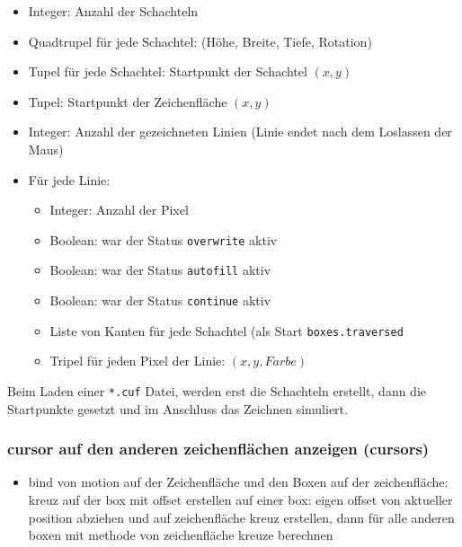 \begin{itemize}
\item Integer: Anzahl der Schachteln
\item Quadtrupel für jede Schachtel: (Höhe, Breite, Tiefe, Rotation)
\item Tupel für jede Schachtel: Startpunkt der Schachtel $(x,y)$
\item Tupel: Startpunkt der Zeichenfläche $(x,y)$
\item Integer: Anzahl der gezeichneten Linien (Linie endet nach dem Loslassen der Maus)
\item Für jede Linie:
  \begin{itemize}
    \item Integer: Anzahl der Pixel
    \item Boolean: war der Status \texttt{overwrite} aktiv
    \item Boolean: war der Status \texttt{autofill} aktiv
    \item Boolean: war der Status \texttt{continue} aktiv
    \item Liste von Kanten für jede Schachtel (als Start \texttt{boxes.traversed}
    \item Tripel für jeden Pixel der Linie: $(x, y, Farbe)$
  \end{itemize}
\end{itemize}

Beim Laden einer \texttt{*.cuf} Datei, werden erst die Schachteln erstellt, dann die Startpunkte gesetzt und im Anschluss das Zeichnen simuliert.

\subsubsection{cursor auf den anderen zeichenflächen anzeigen (cursors)}
\label{subsubsec:cursor}

\begin{itemize}
\item bind von motion auf der Zeichenfläche und den Boxen auf der zeichenfläche:
kreuz auf der box mit offset erstellen auf einer box: eigen offset
von aktueller position abziehen und auf zeichenfläche kreuz erstellen,
dann für alle anderen boxen mit methode von zeichenfläche kreuze berechnen
\end{itemize}


